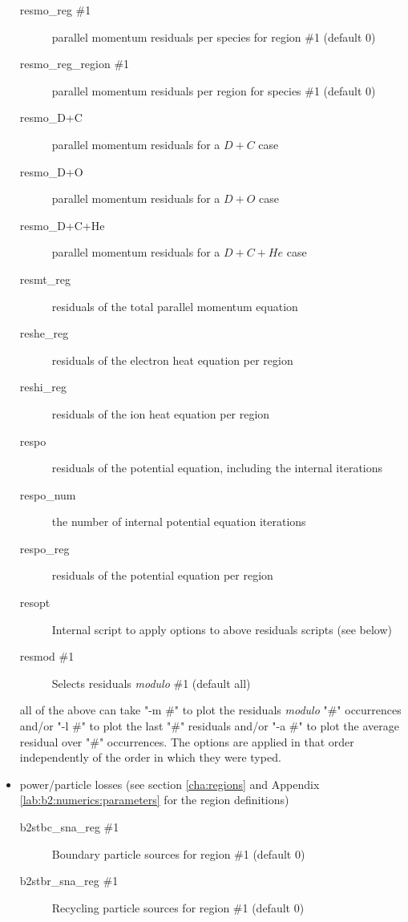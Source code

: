 \documentclass[a4paper,10pt]{report}
\begin{document}
\begin{itemize}
\begin{description}
  \item[resmo\_reg \#1] parallel momentum residuals per species for region \#1 (default 0)
  \item[resmo\_reg\_region \#1] parallel momentum residuals per region for species \#1 (default 0)
  \item[resmo\_D+C] parallel momentum residuals for a $D+C$ case
  \item[resmo\_D+O] parallel momentum residuals for a $D+O$ case
  \item[resmo\_D+C+He] parallel momentum residuals for a $D+C+He$ case
  \item[resmt\_reg] residuals of the total parallel momentum equation
  \item[reshe\_reg] residuals of the electron heat equation per region
  \item[reshi\_reg] residuals of the ion heat equation per region
  \item[respo]  residuals of the potential equation,
    including the internal iterations
  \item[respo\_num]  the number of internal
    potential equation iterations
  \item[respo\_reg] residuals of the potential equation per region
  \item[resopt] Internal script to apply options to above residuals scripts (see below)
  \item[resmod \#1] Selects residuals {\it modulo} \#1 (default all)
  \end{description}
all of the above can take "-m \#" to plot the residuals {\it modulo} "\#" occurrences
and/or "-l \#" to plot the last "\#" residuals
and/or "-a \#" to plot the average residual over "\#" occurrences.
The options are applied in that order independently of the order in which they were typed.
\item power/particle losses (see section \ref{cha:regions} and Appendix \ref{lab:b2:numerics:parameters} for the region definitions)
  \begin{description}
  \item[b2stbc\_sna\_reg \#1] Boundary particle sources for region \#1 (default 0)
  \item[b2stbr\_sna\_reg \#1] Recycling particle sources for region \#1 (default 0)

\end{description}
\end{itemize}
\end{document}
